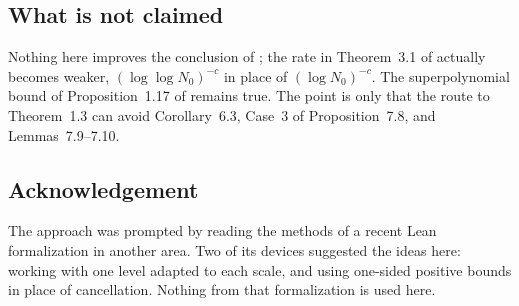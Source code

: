 \documentclass[11pt]{amsart}
\theoremstyle{remark}
\newcommand{\Tc}{\cite{Tao22}}         %
\theoremstyle{plain}
\begin{document}
\subsection{What is not claimed}
Nothing here improves the conclusion of \Tc; the rate in Theorem~3.1 of \Tc{} actually becomes weaker, $(\log\log N_0)^{-c}$ in place of $(\log N_0)^{-c}$. The superpolynomial bound of Proposition~1.17 of \Tc{} remains true. The point is only that the route to Theorem~1.3 can avoid Corollary~6.3, Case~3 of Proposition~7.8, and Lemmas~7.9--7.10.

\subsection*{Acknowledgement}
The approach was prompted by reading the methods of a recent Lean formalization in another area. Two of its devices suggested the ideas here: working with one level adapted to each scale, and using one-sided positive bounds in place of cancellation. Nothing from that formalization is used here.

\printbibliography
\end{document}
